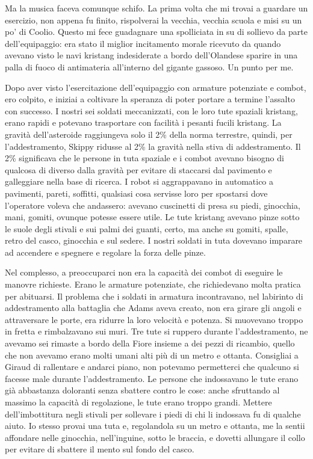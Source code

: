 Ma la musica faceva comunque schifo. La prima volta che mi trovai a
guardare un esercizio, non appena fu finito, rispolverai la vecchia,
vecchia scuola e misi su un po' di Coolio. Questo mi fece guadagnare una
spolliciata in su di sollievo da parte dell'equipaggio: era stato il
miglior incitamento morale ricevuto da quando avevano visto le navi
kristang indesiderate a bordo dell'Olandese sparire in una palla di
fuoco di antimateria all'interno del gigante gassoso. Un punto per me.

\hfill\break

Dopo aver visto l'esercitazione dell'equipaggio con armature potenziate
e combot, ero colpito, e iniziai a coltivare la speranza di poter
portare a termine l'assalto con successo. I nostri sei soldati
meccanizzati, con le loro tute spaziali kristang, erano rapidi e
potevano trasportare con facilità i pesanti fucili kristang. La gravità
dell'asteroide raggiungeva solo il 2\% della norma terrestre, quindi,
per l'addestramento, Skippy ridusse al 2\% la gravità nella stiva di
addestramento. Il 2\% significava che le persone in tuta spaziale e i
combot avevano bisogno di qualcosa di diverso dalla gravità per evitare
di staccarsi dal pavimento e galleggiare nella base di ricerca. I robot
si aggrappavano in automatico a pavimenti, pareti, soffitti, qualsiasi
cosa servisse loro per spostarsi dove l'operatore voleva che andassero:
avevano cuscinetti di presa su piedi, ginocchia, mani, gomiti, ovunque
potesse essere utile. Le tute kristang avevano pinze sotto le suole
degli stivali e sui palmi dei guanti, certo, ma anche su gomiti, spalle,
retro del casco, ginocchia e sul sedere. I nostri soldati in tuta
dovevano imparare ad accendere e spegnere e regolare la forza delle
pinze.

Nel complesso, a preoccuparci non era la capacità dei combot di eseguire
le manovre richieste. Erano le armature potenziate, che richiedevano
molta pratica per abituarsi. Il problema che i soldati in armatura
incontravano, nel labirinto di addestramento alla battaglia che Adams
aveva creato, non era girare gli angoli e attraversare le porte, era
ridurre la loro velocità e potenza. Si muovevano troppo in fretta e
rimbalzavano sui muri. Tre tute si ruppero durante l'addestramento, ne
avevamo sei rimaste a bordo della Fiore insieme a dei pezzi di ricambio,
quello che non avevamo erano molti umani alti più di un metro e ottanta.
Consigliai a Giraud di rallentare e andarci piano, non potevamo
permetterci che qualcuno si facesse male durante l'addestramento. Le
persone che indossavano le tute erano già abbastanza doloranti senza
sbattere contro le cose: anche sfruttando al massimo la capacità di
regolazione, le tute erano troppo grandi. Mettere dell'imbottitura negli
stivali per sollevare i piedi di chi li indossava fu di qualche aiuto.
Io stesso provai una tuta e, regolandola su un metro e ottanta, me la
sentii affondare nelle ginocchia, nell'inguine, sotto le braccia, e
dovetti allungare il collo per evitare di sbattere il mento sul fondo
del casco.


